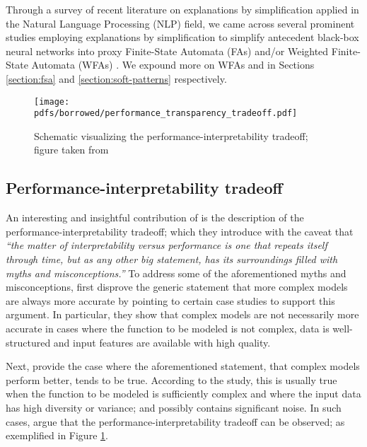 Through a survey of recent literature on explanations by simplification applied in the Natural Language Processing (NLP) field, we came across several prominent studies employing explanations by simplification to simplify antecedent black-box neural networks into proxy Finite-State Automata (FAs) and/or Weighted Finite-State Automata (WFAs) \citep{schwartz2018sopa,peng2018rational,suresh-etal-2019-distilling,wang2019state,jiang2020cold}. We expound more on WFAs and \citet{schwartz2018sopa} in Sections \ref{section:fsa} and \ref{section:soft-patterns} respectively.

\begin{figure}[t]
  \centering
  \texttt{[image: pdfs/borrowed/performance\_transparency\_tradeoff.pdf]}
  \caption{Schematic visualizing the performance-interpretability tradeoff; figure taken from \citet{arrieta2020explainable}}
  \label{fig:performance_interpretability_tradeoff}
\end{figure}

\subsection{Performance-interpretability tradeoff}

An interesting and insightful contribution of \citet[Page 18, Section 5.1]{arrieta2020explainable} is the description of the performance-interpretability tradeoff; which they introduce with the caveat that \textit{``the matter of interpretability versus performance is one that repeats itself through time, but as any other big statement, has its surroundings filled with myths and misconceptions.''} To address some of the aforementioned myths and misconceptions, \citet{arrieta2020explainable} first disprove the generic statement that more complex models are always more accurate by pointing to certain case studies to support this argument. In particular, they show that complex models are not necessarily more accurate in cases where the function to be modeled is not complex, data is well-structured and input features are available with high quality.

Next, \citet{arrieta2020explainable} provide the case where the aforementioned statement, that complex models perform better, tends to be true. According to the study, this is usually true when the function to be modeled is sufficiently complex and where the input data has high diversity or variance; and possibly contains significant noise. In such cases, \citet{arrieta2020explainable} argue that the performance-interpretability tradeoff can be observed; as exemplified in Figure \ref{fig:performance_interpretability_tradeoff}.
 
